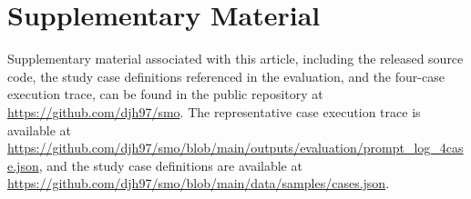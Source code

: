 \documentclass[preprint,12pt]{elsarticle}
\begin{document}
  

\appendix
\section{Supplementary Material}
\label{app1}

Supplementary material associated with this article, including the released source code, the study case definitions referenced in the evaluation, and the four-case execution trace, can be found in the public repository at \url{https://github.com/djh97/smo}. The representative case execution trace is available at \url{https://github.com/djh97/smo/blob/main/outputs/evaluation/prompt_log_4case.json}, and the study case definitions are available at \url{https://github.com/djh97/smo/blob/main/data/samples/cases.json}.



 


\end{document}

